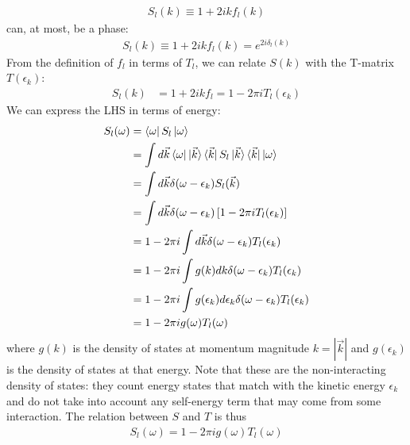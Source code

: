 \documentclass[twoside]{report}
\numberwithin{equation}{section}
\begin{document}
\begin{equation}\begin{aligned}
	S_l(k) \equiv 1 + 2i k f_l (k)
\end{aligned}\end{equation}
can, at most, be a phase:
\begin{equation}\begin{aligned}
	S_l (k)\equiv 1 + 2i k f_l (k) = e^{2i\delta_l(k)}
\end{aligned}\end{equation}
From the definition of \(f_l\) in terms of \(T_l\), we can relate \(S(k)\) with the T-matrix \(T(\epsilon_k)\):
\begin{equation}\begin{aligned}
	S_l(k) &= 1 + 2i k f_l = 1 - 2 \pi i T_l(\epsilon_k)
\end{aligned}\end{equation}
We can express the LHS in terms of energy:
\begin{equation}\begin{aligned}
	S_l(\omega) &= \bra{\omega}S_l\ket{\omega} \\
			   &= \int d\vec k \bra{\omega}\ket{\vec k}\bra{\vec k}S_l\ket{\vec k}\bra{\vec k}\ket{\omega}\\
			   &= \int d\vec k \delta(\omega - \epsilon_k)S_l(\vec k)\\
			   &= \int d\vec k \delta(\omega - \epsilon_k)\left[1 - 2 \pi i T_l(\epsilon_k)\right]\\
			   &= 1 - 2 \pi i \int d\vec k \delta(\omega - \epsilon_k)T_l(\epsilon_k)\\
			   &= 1 - 2 \pi i \int g(k) d k \delta(\omega - \epsilon_k)T_l(\epsilon_k)\\
			   &= 1 - 2 \pi i \int g(\epsilon_k) d \epsilon_k \delta(\omega - \epsilon_k)T_l(\epsilon_k)\\
			   &= 1 - 2 \pi i g(\omega) T_l(\omega)
\end{aligned}\end{equation}
where \(g(k)\) is the density of states at momentum magnitude \(k = |\vec k|\) and \(g(\epsilon_k)\) is the density of states at that energy. Note that these are the non-interacting density of states: they count energy states that match with the kinetic energy \(\epsilon_k\) and do not take into account any self-energy term that may come from some interaction. The relation between \(S\) and \(T\) is thus
\begin{equation}\begin{aligned}
	\label{S_in_T}
	S_l(\omega) = 1 - 2 \pi i g(\omega) T_l(\omega)
\end{aligned}\end{equation}
\end{document}
